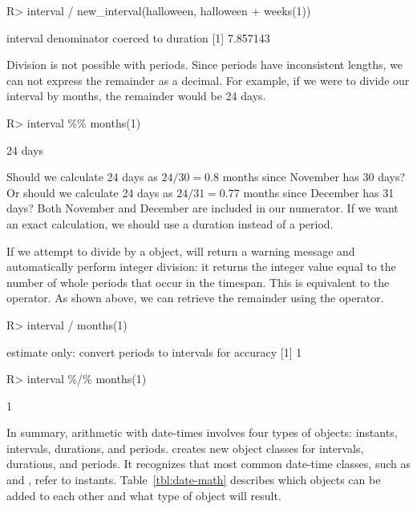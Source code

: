 \documentclass[article]{jss}
\begin{document}
\begin{CodeInput}
R> interval / new_interval(halloween, halloween + weeks(1))
\end{CodeInput}
\begin{CodeOutput}
interval denominator coerced to duration
[1] 7.857143
\end{CodeOutput}


Division is not possible with periods. Since periods have inconsistent lengths, we can not express the remainder as a decimal. For example, if we were to divide our interval by months, the remainder would be 24 days.

\begin{CodeInput}
R> interval \%\% months(1)
\end{CodeInput}
\begin{CodeOutput}
[1] 24 days
\end{CodeOutput}

Should we calculate 24 days as $24 / 30 = 0.8$ months since November has 30 days? Or should we calculate 24 days as $24 / 31 = 0.77$ months since December has 31 days? Both November and December are included in our numerator. If we want an exact calculation, we should use a duration instead of a period. 

If we attempt to divide by a  object,  will return a warning message and automatically perform integer division: it returns the integer value equal to the number of whole periods that occur in the timespan. This is equivalent to the \code{\%/\%} operator. As shown above, we can retrieve the remainder using the \code{\%\%} operator.

\begin{CodeInput}
R> interval / months(1)
\end{CodeInput}
\begin{CodeOutput}
estimate only: convert periods to intervals for accuracy
[1] 1
\end{CodeOutput}

\begin{CodeInput}
R> interval \%/\% months(1)
\end{CodeInput}
\begin{CodeOutput}
[1] 1
\end{CodeOutput}

In summary, arithmetic with date-times involves four types of objects: instants, intervals, durations, and periods.  creates new object classes for intervals, durations, and periods. It recognizes that most common date-time classes, such as  and , refer to instants. Table~\ref{tbl:date-math} describes which objects can be added to each other and what type of object will result.
\end{document}
